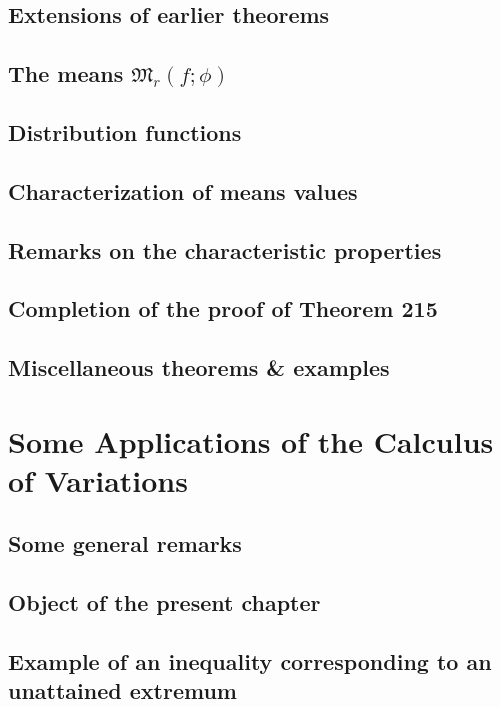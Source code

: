 \documentclass[oneside]{book}
\numberwithin{equation}{section}
\begin{document}
\subsection{Extensions of earlier theorems}

\subsection{The means $\mathfrak{M}_r(f;\phi)$}

\subsection{Distribution functions}

\subsection{Characterization of means values}

\subsection{Remarks on the characteristic properties}

\subsection{Completion of the proof of Theorem 215}

\subsection{Miscellaneous theorems \& examples}


\section{Some Applications of the Calculus of Variations}

\subsection{Some general remarks}

\subsection{Object of the present chapter}

\subsection{Example of an inequality corresponding to an unattained extremum}
\end{document}
